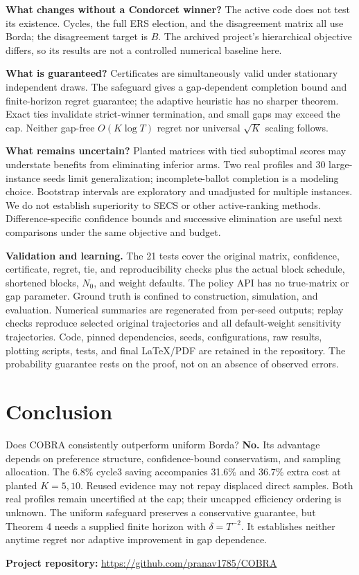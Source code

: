 \documentclass[11pt,a4paper]{article}
\begin{document}
\textbf{What changes without a Condorcet winner?} The active code does not test its existence. Cycles, the full ERS election, and the disagreement matrix all use Borda; the disagreement target is $B$. The archived project's hierarchical objective differs, so its results are not a controlled numerical baseline here.

\textbf{What is guaranteed?} Certificates are simultaneously valid under stationary independent draws. The safeguard gives a gap-dependent completion bound and finite-horizon regret guarantee; the adaptive heuristic has no sharper theorem. Exact ties invalidate strict-winner termination, and small gaps may exceed the cap. Neither gap-free $O(K\log T)$ regret nor universal $\sqrt K$ scaling follows.

\textbf{What remains uncertain?} Planted matrices with tied suboptimal scores may understate benefits from eliminating inferior arms. Two real profiles and 30 large-instance seeds limit generalization; incomplete-ballot completion is a modeling choice. Bootstrap intervals are exploratory and unadjusted for multiple instances. We do not establish superiority to SECS or other active-ranking methods. Difference-specific confidence bounds and successive elimination are useful next comparisons under the same objective and budget.

\textbf{Validation and learning.} The 21 tests cover the original matrix, confidence, certificate, regret, tie, and reproducibility checks plus the actual block schedule, shortened blocks, $N_0$, and weight defaults. The policy API has no true-matrix or gap parameter. Ground truth is confined to construction, simulation, and evaluation. Numerical summaries are regenerated from per-seed outputs; replay checks reproduce selected original trajectories and all default-weight sensitivity trajectories. Code, pinned dependencies, seeds, configurations, raw results, plotting scripts, tests, and final LaTeX/PDF are retained in the repository. The probability guarantee rests on the proof, not on an absence of observed errors.

\section{Conclusion}
Does COBRA consistently outperform uniform Borda? \textbf{No.} Its advantage depends on preference structure, confidence-bound conservatism, and sampling allocation. The 6.8\% cycle3 saving accompanies 31.6\% and 36.7\% extra cost at planted $K=5,10$. Reused evidence may not repay displaced direct samples. Both real profiles remain uncertified at the cap; their uncapped efficiency ordering is unknown. The uniform safeguard preserves a conservative guarantee, but Theorem 4 needs a supplied finite horizon with $\delta=T^{-2}$. It establishes neither anytime regret nor adaptive improvement in gap dependence.

\FloatBarrier
{}

\noindent\textbf{Project repository:} \url{https://github.com/pranav1785/COBRA}
\end{document}

